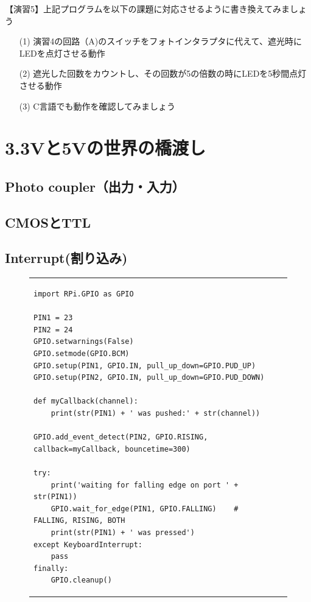 \documentclass[uplatex,a4paper,11pt,oneside,openany]{jsbook}
\begin{document}
【演習5】上記プログラムを以下の課題に対応させるように書き換えてみましょう
\begin{enumerate}
\item[(1)] 演習4の回路（A)のスイッチをフォトインタラプタに代えて、遮光時にLEDを点灯させる動作
\item[(2)] 遮光した回数をカウントし、その回数が5の倍数の時にLEDを5秒間点灯させる動作
\item[(3)] C言語でも動作を確認してみましょう
\end{enumerate}

\section{3.3Vと5Vの世界の橋渡し}

\subsection{Photo coupler（出力・入力）}

\subsection{CMOSとTTL}

\subsection{Interrupt(割り込み)}

\begin{figure}[htpb]
    \begin{tabular}{lr}
      \begin{minipage}{\hsize}

\begin{lstlisting}[caption=Interrupt(Python),label=prog2]
import RPi.GPIO as GPIO

PIN1 = 23
PIN2 = 24
GPIO.setwarnings(False)
GPIO.setmode(GPIO.BCM)
GPIO.setup(PIN1, GPIO.IN, pull_up_down=GPIO.PUD_UP)
GPIO.setup(PIN2, GPIO.IN, pull_up_down=GPIO.PUD_DOWN)

def myCallback(channel):
    print(str(PIN1) + ' was pushed:' + str(channel))

GPIO.add_event_detect(PIN2, GPIO.RISING, callback=myCallback, bouncetime=300)

try:
    print('waiting for falling edge on port ' + str(PIN1))
    GPIO.wait_for_edge(PIN1, GPIO.FALLING)    # FALLING, RISING, BOTH
    print(str(PIN1) + ' was pressed')
except KeyboardInterrupt:
    pass
finally:
    GPIO.cleanup()
\end{lstlisting}

    \end{minipage}
    \begin{minipage}{0\hsize}

    \end{minipage}
  \end{tabular}
\end{figure}%
\end{document}
